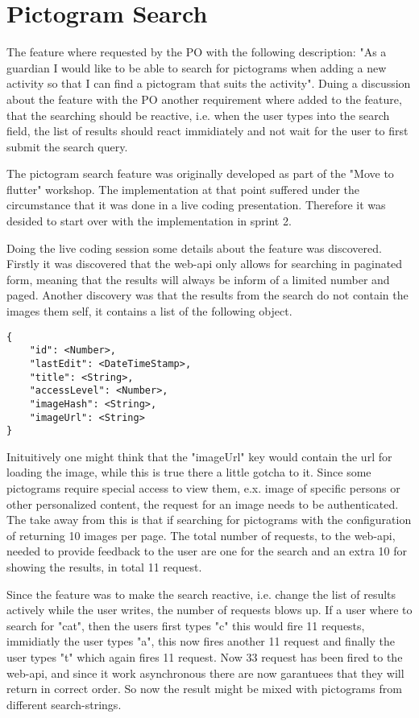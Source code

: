\section{Pictogram Search}
The feature where requested by the \gls{PO} with the following description: "As a guardian I would like to be able to search for pictograms when adding a new activity so that I can find a pictogram that suits the activity". Duing a discussion about the feature with the \gls{PO} another requirement where added to the feature, that the searching should be reactive, i.e. when the user types into the search field, the list of results should react immidiately and not wait for the user to first submit the search query.

The pictogram search feature was originally developed as part of the "Move to flutter" workshop. The implementation at that point suffered under the circumstance that it was done in a live coding presentation. Therefore it was desided to start over with the implementation in sprint 2.

Doing the live coding session some details about the feature was discovered. Firstly it was discovered that the web-api only allows for searching in paginated form, meaning that the results will always be inform of a limited number and paged. Another discovery was that the results from the search do not contain the images them self, it contains a list of the following object.

\begin{lstlisting}
{
    "id": <Number>,
    "lastEdit": <DateTimeStamp>,
    "title": <String>,
    "accessLevel": <Number>,
    "imageHash": <String>,
    "imageUrl": <String>
}
\end{lstlisting}

Inituitively one might think that the "imageUrl" key would contain the url for loading the image, while this is true there a little gotcha to it. Since some pictograms require special access to view them, e.x. image of specific persons or other personalized content, the request for an image needs to be authenticated. The take away from this is that if searching for pictograms with the configuration of returning 10 images per page. The total number of requests, to the web-api, needed to provide feedback to the user are one for the search and an extra 10 for showing the results, in total 11 request.

Since the feature was to make the search reactive, i.e. change the list of results actively while the user writes, the number of requests blows up. If a user where to search for "cat", then the users first types "c" this would fire 11 requests, immidiatly the user types "a", this now fires another 11 request and finally the user types "t" which again fires 11 request. Now 33 request has been fired to the web-api, and since it work asynchronous there are now garantuees that they will return in correct order. So now the result might be mixed with pictograms from different search-strings.

